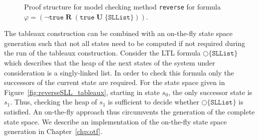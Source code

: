 \documentclass[a4paper, 12pt, twoside]{report}
\begin{document}
\begin{figure}
\begin{center}
{}
			\caption{Proof structure for model checking method \texttt{reverse} for formula $\varphi=(\neg\texttt{true}\;\textbf{R}\;(\texttt{true}\;\textbf{U}\;\{\texttt{SLList}\}))$.}\label{fig:tableaux_ps}
		\end{center}
	\end{figure}
	
	The tableaux construction can be combined with an on-the-fly state space generation such that not all states need to be computed if not required during the run of the tableaux construction. Consider the LTL formula $\bigcirc\{\texttt{SLList}\}$ which describes that the heap of the next states of the system under consideration is a singly-linked list. In order to check this formula only the successors of the current state are required. For the state space given in Figure~\ref{fig:reverseSLL_tableaux}, starting in state $s_0$, the only successor state is $s_1$. Thus, checking the heap of $s_1$ is sufficient to decide whether $\bigcirc\{\texttt{SLList}\}$ is satisfied. An on-the-fly approach thus circumvents the generation of the complete state space. We describe an implementation of the on-the-fly state space generation in Chapter~\ref{chp:otf}.
	\newpage
	
\end{document}
